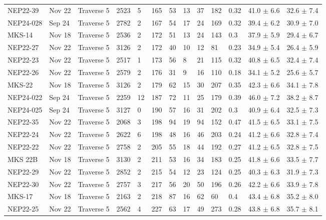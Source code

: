 \begin{landscape}
{\begin{longtable}{l l l l l l l l l l l l l}
    NEP22-39 & Nov 22 & Traverse 5 & 2523 & 5 & 165 & 53 & 13 & 37 & 182 & 0.32 & 41.0 $\pm$ 6.6 & 32.6 $\pm$ 7.4 \\
    NEP24-028 & Sep 24 & Traverse 5 & 2782 & 2 & 167 & 54 & 17 & 24 & 169 & 0.32 & 39.4 $\pm$ 6.2 & 30.9 $\pm$ 7.0 \\
    MKS-14 & Nov 18 & Traverse 5 & 2536 & 2 & 172 & 51 & 13 & 24 & 143 & 0.3 & 37.9 $\pm$ 5.9 & 29.4 $\pm$ 6.7 \\
    NEP22-27 & Nov 22 & Traverse 5 & 3126 & 2 & 172 & 40 & 10 & 12 & 81 & 0.23 & 34.9 $\pm$ 5.4 & 26.4 $\pm$ 5.9 \\
    NEP22-23 & Nov 22 & Traverse 5 & 2517 & 1 & 173 & 56 & 8 & 21 & 115 & 0.32 & 40.8 $\pm$ 6.5 & 32.4 $\pm$ 7.4 \\
    NEP22-26 & Nov 22 & Traverse 5 & 2579 & 2 & 176 & 31 & 9 & 16 & 110 & 0.18 & 34.1 $\pm$ 5.2 & 25.6 $\pm$ 5.7 \\
    MKS-22 & Nov 18 & Traverse 5 & 3126 & 2 & 179 & 62 & 15 & 30 & 207 & 0.35 & 42.3 $\pm$ 6.6 & 34.1 $\pm$ 7.8 \\
    NEP24-022 & Sep 24 & Traverse 5 & 2259 & 12 & 187 & 72 & 11 & 25 & 179 & 0.39 & 46.0 $\pm$ 7.2 & 38.2 $\pm$ 8.7 \\
    NEP24-025 & Sep 24 & Traverse 5 & 3127 & 0 & 190 & 57 & 16 & 31 & 202 & 0.3 & 40.9 $\pm$ 6.4 & 32.5 $\pm$ 7.3 \\
    NEP22-35 & Nov 22 & Traverse 5 & 2068 & 3 & 198 & 94 & 19 & 94 & 152 & 0.47 & 41.5 $\pm$ 6.5 & 33.1 $\pm$ 7.5 \\
    NEP22-24 & Nov 22 & Traverse 5 & 2622 & 6 & 198 & 48 & 16 & 46 & 203 & 0.24 & 41.2 $\pm$ 6.6 & 32.8 $\pm$ 7.4 \\
    NEP22-22 & Nov 22 & Traverse 5 & 2758 & 2 & 205 & 55 & 18 & 44 & 192 & 0.27 & 41.2 $\pm$ 6.5 & 32.8 $\pm$ 7.5 \\
    MKS 22B & Nov 18 & Traverse 5 & 3130 & 2 & 211 & 53 & 16 & 34 & 183 & 0.25 & 41.8 $\pm$ 6.6 & 33.5 $\pm$ 7.7 \\
    NEP22-29 & Nov 22 & Traverse 5 & 2852 & 2 & 215 & 54 & 12 & 23 & 124 & 0.25 & 40.3 $\pm$ 6.3 & 31.9 $\pm$ 7.3 \\
    NEP22-30 & Nov 22 & Traverse 5 & 2757 & 3 & 217 & 56 & 20 & 50 & 196 & 0.26 & 42.2 $\pm$ 6.6 & 33.9 $\pm$ 7.8 \\
    MKS-17 & Nov 18 & Traverse 5 & 2163 & 2 & 218 & 87 & 16 & 62 & 60 & 0.4 & 43.4 $\pm$ 6.8 & 35.2 $\pm$ 8.0 \\
    NEP22-25 & Nov 22 & Traverse 5 & 2562 & 4 & 227 & 63 & 17 & 49 & 273 & 0.28 & 43.8 $\pm$ 6.8 & 35.7 $\pm$ 8.1 \\

\end{longtable}}
\end{landscape}
